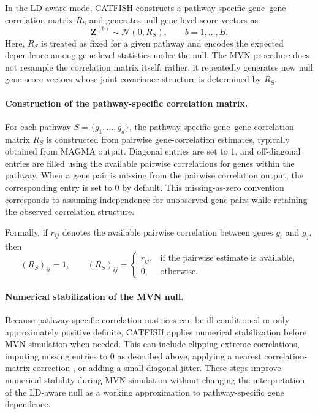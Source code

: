 \documentclass[unnumsec,webpdf,contemporary,large]{oup-authoring-template}%
\theoremstyle{thmstyleone}%
\theoremstyle{thmstyletwo}%
\theoremstyle{thmstylethree}%
\begin{document}
\begin{appendices}
In the LD-aware mode, CATFISH constructs a pathway-specific gene--gene correlation matrix $R_S$ and generates null gene-level score vectors as
\[
\mathbf{Z}^{(b)}
\sim
\mathcal{N}(0,R_S),
\qquad
b=1,\dots,B.
\]
Here, $R_S$ is treated as fixed for a given pathway and encodes the expected dependence among gene-level statistics under the null. The MVN procedure does not resample the correlation matrix itself; rather, it repeatedly generates new null gene-score vectors whose joint covariance structure is determined by $R_S$.

\paragraph{Construction of the pathway-specific correlation matrix.}
For each pathway $S=\{g_1,\dots,g_d\}$, the pathway-specific gene--gene correlation matrix $R_S$ is constructed from pairwise gene-correlation estimates, typically obtained from MAGMA output. Diagonal entries are set to 1, and off-diagonal entries are filled using the available pairwise correlations for genes within the pathway. When a gene pair is missing from the pairwise correlation output, the corresponding entry is set to 0 by default. This missing-as-zero convention corresponds to assuming independence for unobserved gene pairs while retaining the observed correlation structure.

Formally, if $r_{ij}$ denotes the available pairwise correlation between genes $g_i$ and $g_j$, then
\[
(R_S)_{ii}=1,
\qquad
(R_S)_{ij}
=
\begin{cases}
r_{ij}, & \text{if the pairwise estimate is available},\\
0, & \text{otherwise}.
\end{cases}
\]

\paragraph{Numerical stabilization of the MVN null.}
Because pathway-specific correlation matrices can be ill-conditioned or only approximately positive definite, CATFISH applies numerical stabilization before MVN simulation when needed. This can include clipping extreme correlations, imputing missing entries to 0 as described above, applying a nearest correlation-matrix correction \citep{Higham2002}, or adding a small diagonal jitter. These steps improve numerical stability during MVN simulation without changing the interpretation of the LD-aware null as a working approximation to pathway-specific gene dependence.


\end{appendices}
\end{document}

